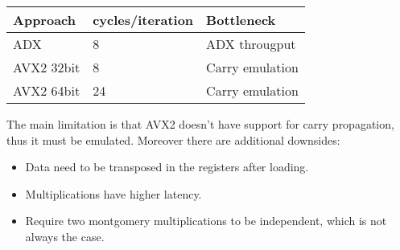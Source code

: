 \begin{tabular}{ |l|l|l|}
	\hline
 	Approach & cycles/iteration & Bottleneck \\ \hline
 	ADX & 8 & ADX througput \\ \hline
  	AVX2 32bit & 8 & Carry emulation \\ \hline
 	AVX2 64bit & 24 & Carry emulation \\ \hline
\end{tabular}

The main limitation is that AVX2 doesn't have support for carry propagation, thus it must be emulated. Moreover there are additional downsides:
\begin{itemize}
\item Data need to be transposed in the registers after loading.
\item Multiplications have higher latency.
\item Require two montgomery multiplications to be independent, which is not always the case.
\end{itemize}
